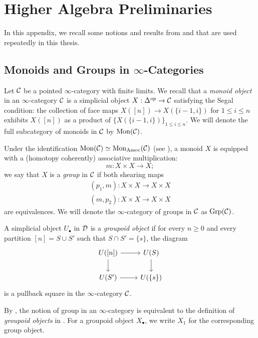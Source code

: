 \chapter{Higher Algebra Preliminaries}

In this appendix, we recall some notions and results from \cite{HTT} and \cite{HA} that are used repeatedly in this thesis.


\section{Monoids and Groups in $\infty$-Categories}
Let ${\mathcal{C}}$ be a pointed $\infty$-category with finite limits. 
We recall that a \emph{monoid object} in an $\infty$-category ${\mathcal{C}}$ \cite[
Definition 4.1.2.5.]{HA} is a simplicial object $X: \Delta^{op}\to {\mathcal{C}}$ satisfying the Segal condition:
the collection of face maps $X([n])\to X(\{i-1,i\})$ for $1\leq i \leq n$ exhibits $X([n])$ as a product of $\{X(\{i-1,i\})\}_{1\leq i \leq n}$. 
We will denote the full subcategory of monoids in ${\mathcal{C}}$ by $\operatorname{Mon}({\mathcal{C}})$.

Under the identification $\operatorname{Mon}({\mathcal{C}})\simeq \operatorname{Mon}_{\operatorname{Assoc}}({\mathcal{C}})$ (see \cite[Proposition 4.1.2.10.]{HA}), a monoid $X$ is equipped with a (homotopy coherently) associative multiplication:
$$
m: X\times X\to X;
$$
we say that $X$ is a \emph{group} in ${\mathcal{C}}$ \cite[Definition 5.2.6.2.]{HA} if both shearing maps
\begin{align*}
			(p_1, m):X\times X\to X\times X\\
	(m,p_2):X\times X\to X\times X
\end{align*}
are equivalences. 
We will denote the $\infty$-category of groups in ${\mathcal{C}}$ as $\operatorname{Grp}({\mathcal{C}})$.
\begin{definition}
	\cite[Definition 6.1.2.7.]{HTT}
	A simplicial object $U_{\bullet}$ in ${\mathcal{D}}$ is a \textit{groupoid object} if for every $n\geq 0$ and every partition $[n]=S\cup S'$ such that $S\cap S'=\{s\}$, the diagram
	\[
	\begin{tikzcd}
		U([n]) \arrow[r] \arrow[d] & U(S) \arrow[d]\\
		U(S') \arrow[r]    & U(\{s\}) 
	\end{tikzcd}
	\]
	is a pullback square in the $\infty$-category ${\mathcal{C}}$.
\end{definition}
\begin{remark}
By \cite[Remark 5.2.6.5.]{HA}, the notion of group in an $\infty$-category is equivalent to the definition of \emph{groupoid objects} in \cite[Definition 6.1.2.7.]{HTT}. For a groupoid object $X_{\bullet}$, we write $X_1$ for the corresponding group object.
\end{remark}


